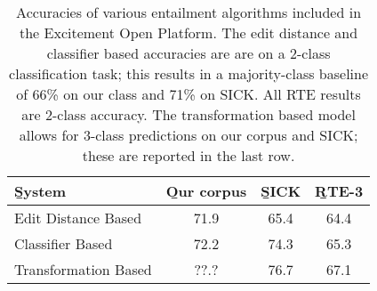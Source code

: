 %

%
%

\begin{table}
\begin{center}
\def\t#1{\small{#1}}
\begin{tabular}{l@{\hskip \colspaceL}c@{\hskip \colspaceL}c@{\hskip \colspaceL}c}
\toprule
\b{System} & \b{Our corpus} & \b{SICK} & \b{RTE-3} \\
\midrule
\t{Edit Distance Based}  & \t{71.9} & \t{65.4} & \t{64.4} \\
\t{Classifier Based}     & \t{72.2} & \t{74.3} & \t{65.3} \\
\t{Transformation Based} & \t{??.?} & \t{76.7} & \t{67.1} \\
\bottomrule
\end{tabular}
\end{center}
\caption{
\label{tab:eopresults}
Accuracies of various entailment algorithms included in the
  Excitement Open Platform.
The edit distance and classifier based accuracies are are on a 2-class
  classification task; this results in a majority-class baseline
  of 66\% on our class and 71\% on SICK.
All RTE results are 2-class accuracy.
The transformation based model allows for 3-class predictions on our
  corpus and SICK; these are reported in the last row.
}
\end{table}
%
%

